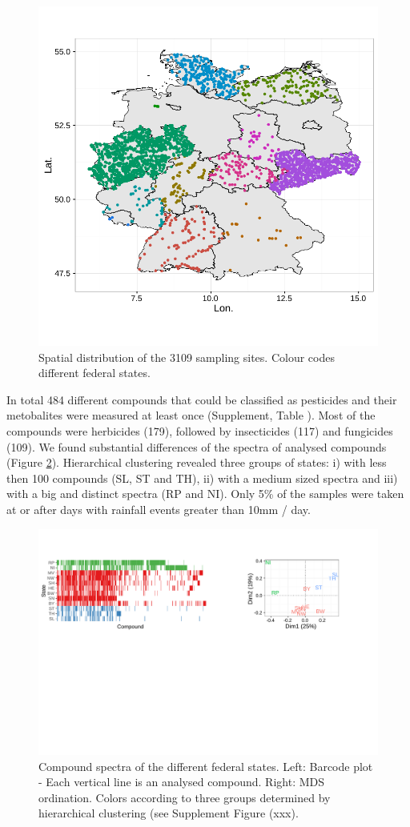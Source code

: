 \documentclass[journal=esthag,manuscript=article]{achemso}
\begin{document}
\begin{figure}
  \includegraphics[width=.8\textwidth]{fig/fig1.pdf}
  \caption{Spatial distribution of the 3109 sampling sites. Colour codes different federal states.}
  \label{fig:fig1}
\end{figure}


In total 484 different compounds that could be classified as pesticides and their metobalites were measured at least once (Supplement, Table ). 
Most of the compounds were herbicides (179), followed by insecticides (117) and fungicides (109).
We found substantial differences of the spectra of analysed compounds (Figure \ref{fig:figvar}).
Hierarchical clustering revealed three groups of states:
i) with less then 100 compounds (SL, ST and TH), ii) with a medium sized spectra and iii) with a big and distinct spectra (RP and NI).
Only 5\% of the samples were taken at or after days with rainfall events greater than 10mm / day.

\begin{figure}
  \includegraphics[width=\textwidth]{fig/figvar.pdf}
  \caption{Compound spectra of the different federal states. Left: Barcode plot - Each vertical line is an analysed compound. Right: MDS ordination. 
  Colors according to three groups determined by hierarchical clustering (see Supplement Figure (xxx).}
  \label{fig:figvar}
\end{figure}
\end{document}
